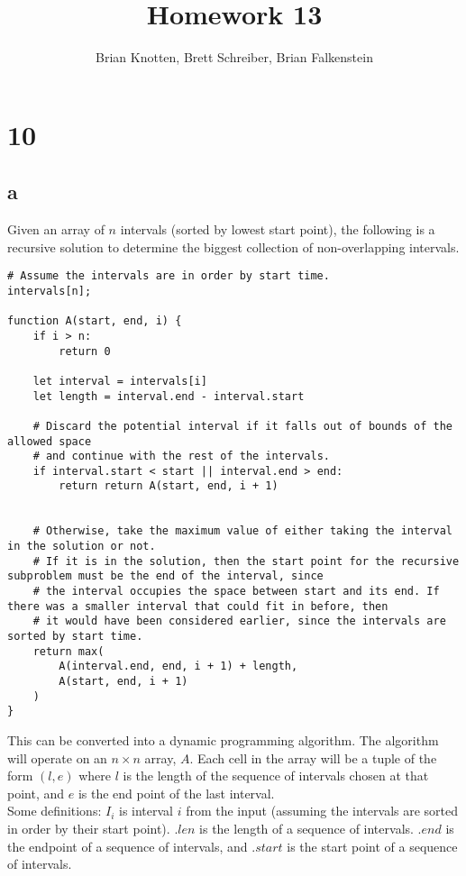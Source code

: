 \documentclass[letterpaper,notitlepage,twoside]{article}
\begin{document}
\title{Homework 13}
\author{Brian Knotten, Brett Schreiber, Brian Falkenstein}
\maketitle

\section*{10}
\subsection*{a}
Given an array of $n$ intervals (sorted by lowest start point), the following is a recursive solution to determine the biggest collection of non-overlapping intervals.
\begin{verbatim}
# Assume the intervals are in order by start time.
intervals[n];

function A(start, end, i) {
    if i > n:
        return 0
    
    let interval = intervals[i]
    let length = interval.end - interval.start
   
    # Discard the potential interval if it falls out of bounds of the allowed space
    # and continue with the rest of the intervals.
    if interval.start < start || interval.end > end:
        return return A(start, end, i + 1)
    
    
    # Otherwise, take the maximum value of either taking the interval in the solution or not.
    # If it is in the solution, then the start point for the recursive subproblem must be the end of the interval, since
    # the interval occupies the space between start and its end. If there was a smaller interval that could fit in before, then
    # it would have been considered earlier, since the intervals are sorted by start time.
    return max(
        A(interval.end, end, i + 1) + length,
        A(start, end, i + 1)
    )
}
\end{verbatim}
This can be converted into a dynamic programming algorithm. The algorithm will operate on an $n\times n$ array, $A$. Each cell in the array will be a tuple of the form $(l, e)$ where $l$ is the length of the sequence of intervals chosen at that point, and $e$ is the end point of the last interval. \\
Some definitions: $I_i$ is interval $i$ from the input (assuming the intervals are sorted in order by their start point). $.len$ is the length of a sequence of intervals. $.end$ is the endpoint of a sequence of intervals, and $.start$ is the start point of a sequence of intervals. \\
\end{document}
